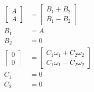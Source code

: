 \documentclass{article}
\begin{document}
\begin{enumerate}
        \begin{align*}
          \begin{bmatrix}
            A \\
            A
          \end{bmatrix} & = \begin{bmatrix}
                              B_1 + B_2 \\
                              B_1 - B_2
                            \end{bmatrix}             \\
          B_1             & = A                        \\
          B_2             & = 0                        \\
          \begin{bmatrix}
            0 \\
            0
          \end{bmatrix} & =\begin{bmatrix}
                             C_1 \omega_1 + C_2 \omega_2 \\
                             C_1 \omega_1 - C_2 \omega_2
                           \end{bmatrix} \\
          C_1             & = 0                        \\
          C_2             & = 0
        \end{align*}
\end{enumerate}

\setcounter{subsection}{8}
\subsection{}
\end{document}
